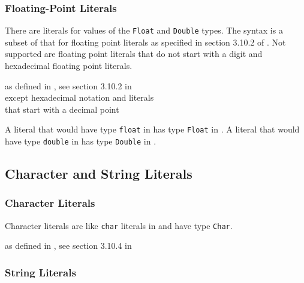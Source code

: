 \subsubsection{Floating-Point Literals}

There are literals for values of the \texttt{Float} and \texttt{Double} types. The syntax is a subset of that for \java{} floating point literals as specified in section 3.10.2 of \cite{langspec3}. Not supported are floating point literals that do not start with a digit and hexadecimal floating point literals.

\begin{flushleft}
as defined in \java{}, see section 3.10.2 in \cite{langspec3}\\
\hspace{0.5in} except hexadecimal notation and literals\\
\hspace{0.5in} that start with a decimal point
\end{flushleft}

A literal that would have type \texttt{float} in \java{} has type \texttt{Float} in \frege{}. A literal that would have type \texttt{double} in \java{} has type \texttt{Double} in \frege{}.

\subsection{Character and String Literals}

\subsubsection{Character Literals} \label{charliteral}

Character literals are like \texttt{char} literals in \java{} and have type \texttt{Char}.

\begin{flushleft}
as defined in \java{}, see section 3.10.4 in \cite{langspec3}\\
\end{flushleft}


\subsubsection{String Literals}

